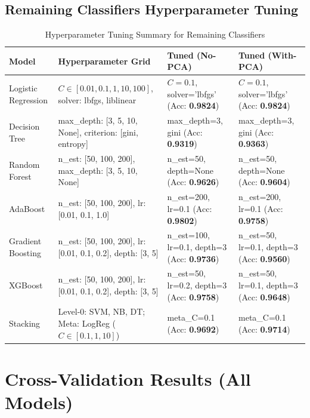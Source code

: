 \documentclass[12pt,a4paper]{article}
\begin{document}
\subsection{Remaining Classifiers Hyperparameter Tuning}
\begin{table}[H]
\centering
\caption{Hyperparameter Tuning Summary for Remaining Classifiers}
\label{tab:other_tuning}
\small
\begin{tabular}{|p{3.2cm}|p{3.8cm}|p{3.8cm}|p{3.8cm}|}
\hline
\textbf{Model} & \textbf{Hyperparameter Grid} & \textbf{Tuned (No-PCA)} & \textbf{Tuned (With-PCA)}\\ \hline
Logistic Regression & $C \in [0.01, 0.1, 1, 10, 100]$, solver: lbfgs, liblinear & $C=0.1$, solver='lbfgs' (Acc: \textbf{0.9824}) & $C=0.1$, solver='lbfgs' (Acc: \textbf{0.9824})\\ \hline
Decision Tree & max\_depth: [3, 5, 10, None], criterion: [gini, entropy] & max\_depth=3, gini (Acc: \textbf{0.9319}) & max\_depth=3, gini (Acc: \textbf{0.9363})\\ \hline
Random Forest & n\_est: [50, 100, 200], max\_depth: [3, 5, 10, None] & n\_est=50, depth=None (Acc: \textbf{0.9626}) & n\_est=50, depth=None (Acc: \textbf{0.9604})\\ \hline
AdaBoost & n\_est: [50, 100, 200], lr: [0.01, 0.1, 1.0] & n\_est=200, lr=0.1 (Acc: \textbf{0.9802}) & n\_est=200, lr=0.1 (Acc: \textbf{0.9758})\\ \hline
Gradient Boosting & n\_est: [50, 100, 200], lr: [0.01, 0.1, 0.2], depth: [3, 5] & n\_est=100, lr=0.1, depth=3 (Acc: \textbf{0.9736}) & n\_est=50, lr=0.1, depth=3 (Acc: \textbf{0.9560})\\ \hline
XGBoost & n\_est: [50, 100, 200], lr: [0.01, 0.1, 0.2], depth: [3, 5] & n\_est=50, lr=0.2, depth=3 (Acc: \textbf{0.9758}) & n\_est=50, lr=0.1, depth=3 (Acc: \textbf{0.9648})\\ \hline
Stacking & Level-0: SVM, NB, DT; Meta: LogReg ($C \in [0.1, 1, 10]$) & meta\_C=0.1 (Acc: \textbf{0.9692}) & meta\_C=0.1 (Acc: \textbf{0.9714})\\ \hline
\end{tabular}
\end{table}

\section{Cross-Validation Results (All Models)}
\end{document}
